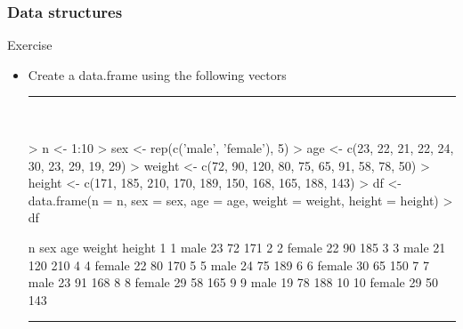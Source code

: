 \documentclass{beamer}
\begin{document}
\begin{frame}[fragile]
	\frametitle{Data structures}
	\centering \LARGE Exercise
	\begin{itemize}
		\small
		\item Create a data.frame using the following vectors 
\rule{\textwidth}{0.4pt}\\
\tiny
\setlength{\fancyvrbtopsep}{-1pt}
\setlength{\fancyvrbpartopsep}{-1pt}
\begin{Schunk}
\begin{Sinput}
> n <- 1:10
> sex <- rep(c('male', 'female'), 5)
> age <- c(23, 22, 21, 22, 24, 30, 23, 29, 19, 29)
> weight <- c(72, 90, 120, 80, 75, 65, 91, 58, 78, 50)
> height <- c(171, 185, 210, 170, 189, 150, 168, 165, 188, 143)
> df <- data.frame(n = n, sex = sex, age = age, weight = weight, height = height)
> df
\end{Sinput}
\begin{Soutput}
    n    sex age weight height
1   1   male  23     72    171
2   2 female  22     90    185
3   3   male  21    120    210
4   4 female  22     80    170
5   5   male  24     75    189
6   6 female  30     65    150
7   7   male  23     91    168
8   8 female  29     58    165
9   9   male  19     78    188
10 10 female  29     50    143
\end{Soutput}
\end{Schunk}

\rule{\textwidth}{0.4pt}\\
\small
	\end{itemize}
\end{frame}
\end{document}
